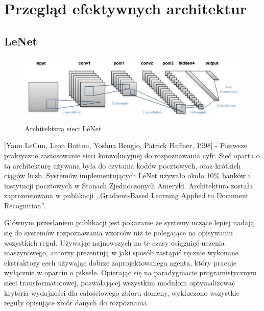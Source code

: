 \documentclass[12pt,a4paper,twoside,titlepage,openright]{book}
\begin{document}
\section{Przegląd efektywnych architektur}

\subsection{LeNet}
\begin{figure}[ht]
	\centering
			\includegraphics[resolution=100, scale=0.6]{LeNet.png}
		\caption{Architektura sieci LeNet}
\end{figure}

[Yann LeCun, Leon Bottou, Yoshua Bengio, Patrick Haffner, 1998] - Pierwsze praktyczne zastosowanie sieci konwolucyjnej do rozpoznawania cyfr. Sieć oparta o tą architekturę używana była do czytania kodów pocztowych, oraz krótkich ciągów liczb. Systemów implementujących LeNet używało około 10\% banków i instytucji pocztowych w Stanach Zjednoczonych Ameryki. Architektura została zaprezentowana w publikacji ,,Gradient-Based Learning Applied to Document Recognition''.

Głównym przesłaniem publikacji jest pokazanie że systemy uczące lepiej nadają się do systemów rozpoznawania wzorców niż te polegające na opisywaniu wszystkich reguł. Używając najnowszych na te czasy osiągnięć uczenia maszynowego, autorzy prezentują w jaki sposób zastąpić ręcznie wykonane ekstraktory cech używając dobrze zaprojektowanego agenta, który pracuje wyłącznie w oparciu o piksele. Opierając się na paradygmacie programistycznym sieci transformatorowej, pozwalającej wszystkim modułom optymalizować kryteria wydajności dla całościowego zbioru domeny, wykluczono wszystkie reguły opisujące zbiór danych do rozpoznania.
\end{document}
